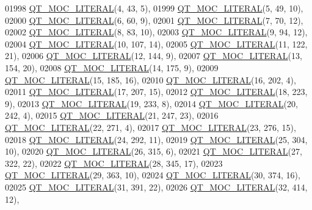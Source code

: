 \begin{DoxyCode}
01998 \hyperlink{a00067_a75bb9482d242cde0a06c9dbdc6b83abe}{QT\_MOC\_LITERAL}(4, 43, 5),
01999 \hyperlink{a00067_a75bb9482d242cde0a06c9dbdc6b83abe}{QT\_MOC\_LITERAL}(5, 49, 10),
02000 \hyperlink{a00067_a75bb9482d242cde0a06c9dbdc6b83abe}{QT\_MOC\_LITERAL}(6, 60, 9),
02001 \hyperlink{a00067_a75bb9482d242cde0a06c9dbdc6b83abe}{QT\_MOC\_LITERAL}(7, 70, 12),
02002 \hyperlink{a00067_a75bb9482d242cde0a06c9dbdc6b83abe}{QT\_MOC\_LITERAL}(8, 83, 10),
02003 \hyperlink{a00067_a75bb9482d242cde0a06c9dbdc6b83abe}{QT\_MOC\_LITERAL}(9, 94, 12),
02004 \hyperlink{a00067_a75bb9482d242cde0a06c9dbdc6b83abe}{QT\_MOC\_LITERAL}(10, 107, 14),
02005 \hyperlink{a00067_a75bb9482d242cde0a06c9dbdc6b83abe}{QT\_MOC\_LITERAL}(11, 122, 21),
02006 \hyperlink{a00067_a75bb9482d242cde0a06c9dbdc6b83abe}{QT\_MOC\_LITERAL}(12, 144, 9),
02007 \hyperlink{a00067_a75bb9482d242cde0a06c9dbdc6b83abe}{QT\_MOC\_LITERAL}(13, 154, 20),
02008 \hyperlink{a00067_a75bb9482d242cde0a06c9dbdc6b83abe}{QT\_MOC\_LITERAL}(14, 175, 9),
02009 \hyperlink{a00067_a75bb9482d242cde0a06c9dbdc6b83abe}{QT\_MOC\_LITERAL}(15, 185, 16),
02010 \hyperlink{a00067_a75bb9482d242cde0a06c9dbdc6b83abe}{QT\_MOC\_LITERAL}(16, 202, 4),
02011 \hyperlink{a00067_a75bb9482d242cde0a06c9dbdc6b83abe}{QT\_MOC\_LITERAL}(17, 207, 15),
02012 \hyperlink{a00067_a75bb9482d242cde0a06c9dbdc6b83abe}{QT\_MOC\_LITERAL}(18, 223, 9),
02013 \hyperlink{a00067_a75bb9482d242cde0a06c9dbdc6b83abe}{QT\_MOC\_LITERAL}(19, 233, 8),
02014 \hyperlink{a00067_a75bb9482d242cde0a06c9dbdc6b83abe}{QT\_MOC\_LITERAL}(20, 242, 4),
02015 \hyperlink{a00067_a75bb9482d242cde0a06c9dbdc6b83abe}{QT\_MOC\_LITERAL}(21, 247, 23),
02016 \hyperlink{a00067_a75bb9482d242cde0a06c9dbdc6b83abe}{QT\_MOC\_LITERAL}(22, 271, 4),
02017 \hyperlink{a00067_a75bb9482d242cde0a06c9dbdc6b83abe}{QT\_MOC\_LITERAL}(23, 276, 15),
02018 \hyperlink{a00067_a75bb9482d242cde0a06c9dbdc6b83abe}{QT\_MOC\_LITERAL}(24, 292, 11),
02019 \hyperlink{a00067_a75bb9482d242cde0a06c9dbdc6b83abe}{QT\_MOC\_LITERAL}(25, 304, 10),
02020 \hyperlink{a00067_a75bb9482d242cde0a06c9dbdc6b83abe}{QT\_MOC\_LITERAL}(26, 315, 6),
02021 \hyperlink{a00067_a75bb9482d242cde0a06c9dbdc6b83abe}{QT\_MOC\_LITERAL}(27, 322, 22),
02022 \hyperlink{a00067_a75bb9482d242cde0a06c9dbdc6b83abe}{QT\_MOC\_LITERAL}(28, 345, 17),
02023 \hyperlink{a00067_a75bb9482d242cde0a06c9dbdc6b83abe}{QT\_MOC\_LITERAL}(29, 363, 10),
02024 \hyperlink{a00067_a75bb9482d242cde0a06c9dbdc6b83abe}{QT\_MOC\_LITERAL}(30, 374, 16),
02025 \hyperlink{a00067_a75bb9482d242cde0a06c9dbdc6b83abe}{QT\_MOC\_LITERAL}(31, 391, 22),
02026 \hyperlink{a00067_a75bb9482d242cde0a06c9dbdc6b83abe}{QT\_MOC\_LITERAL}(32, 414, 12),

\end{DoxyCode}
